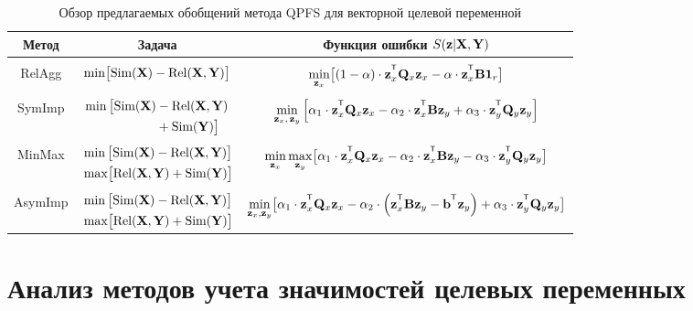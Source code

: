 \begin{table}[ht]
	\centering
	\caption{Обзор предлагаемых обобщений метода QPFS для векторной целевой переменной}
	\small{
		\begin{tabular}{c|c|c}
			\hline
			Метод & Задача & Функция ошибки $S(\mathbf{z} | \mathbf{X}, \mathbf{Y})$ \\
			\hline && \\ [-.5em]
			RelAgg & $\min \bigl[ \text{Sim}(\mathbf{X}) - \text{Rel}(\mathbf{X}, \mathbf{Y}) \bigr] $ & $\min\limits_{\bz_x} \bigl[ (1 - \alpha) \cdot \bz_x^{\T} \bQ_x \bz_x - \alpha \cdot \bz_x^{\T} \bB \bOne_r \bigr] $ \\ &&\\[-.5em]
			SymImp & $\begin{aligned} \min \, \bigl[ \text{Sim}(\mathbf{X}) & - \text{Rel}(\mathbf{X}, \mathbf{Y}) \\ & + \text{Sim}(\mathbf{Y}) \bigr] \end{aligned}$ & $ \min\limits_{\bz_x, \, \bz_y} \left[ \alpha_1 \cdot \bz_x^{\T} \bQ_x \bz_x - \alpha_2 \cdot \bz_x^{\T} \bB \bz_y + \alpha_3 \cdot \bz_y^{\T} \bQ_y \bz_y \right] $\\ &&\\ [-.5em]
			MinMax & $\begin{aligned} &\min \, \bigl[ \text{Sim}(\mathbf{X}) - \text{Rel}(\mathbf{X}, \mathbf{Y}) \bigr]  \\ & \max \bigl[\text{Rel}(\mathbf{X}, \mathbf{Y}) + \text{Sim}(\mathbf{Y}) \bigr] \end{aligned}$ & $	\min\limits_{\bz_x} 	\max\limits_{\bz_y} \bigl[\alpha_1 \cdot \bz_x^{\T} \bQ_x \bz_x - \alpha_2 \cdot \bz_x^{\T} \bB \bz_y - \alpha_3 \cdot \bz_y^{\T} \bQ_y \bz_y \bigr]$ \\ &&\\ [-.5em]
			AsymImp & $\begin{aligned} & \min \, \bigl[ \text{Sim}(\mathbf{X}) - \text{Rel}(\mathbf{X}, \mathbf{Y}) \bigr]\\ &  \max \bigl[\text{Rel}(\mathbf{X}, \mathbf{Y}) + \text{Sim}(\mathbf{Y}) \bigr] \end{aligned}$ & $\min\limits_{\bz_x, \bz_y} \bigl[ \alpha_1 \cdot \bz_x^{\T} \bQ_x \bz_x - \alpha_2 \cdot \left(\bz_x^{\T} \bB \bz_y - \bb^{\T} \bz_y \right) + \alpha_3 \cdot \bz_y^{\T} \bQ_y \bz_y \bigr]$\\ 
			\hline
	\end{tabular}}
	\label{ch3:tbl:summary}
\end{table}


\section{Анализ методов учета значимостей целевых переменных}
\label{sec:ch3:exp_mqpfs}

